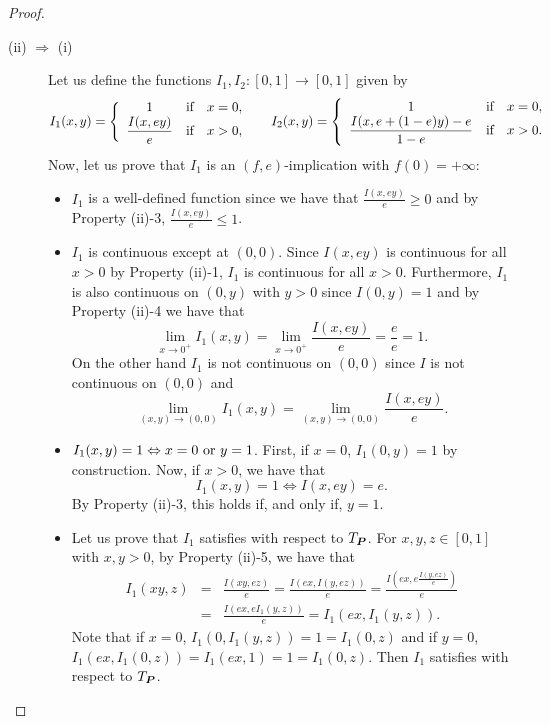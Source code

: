 \begin{proof}
	\begin{description}
	\item[(ii) $\Rightarrow$ (i)] Let us define the functions $I_1,I_2:[0,1] \to [0,1]$ given by
	$$I_1(x,y)=\left\{ \begin{array}{ccl}
		1 &   \hbox{if}  & x=0, \\
		\displaystyle \frac{I(x,ey)}{e} &  \hbox{if} & x>0, \\
	\end{array}
	\right.
	\hspace{0.5cm}
	I_2(x,y)=\left\{ \begin{array}{ccl}
		1 &   \hbox{if}  & x=0, \\
		\displaystyle \frac{I(x,e+(1-e)y)-e}{1-e} &  \hbox{if} & x>0. \\
	\end{array}
	\right.
	$$
	Now, let us prove that $I_1$ is an $(f,e)$-implication with $f(0) = +\infty$:
	\begin{itemize}
		\item $I_1$ is a well-defined function since we have that $\frac{I(x,ey)}{e}\geq 0$ and by Property (ii)-3, $\frac{I(x,ey)}{e} \leq 1$.
		\item $I_1$ is continuous except at $(0,0)$. Since $I(x,ey)$ is continuous for all $x>0$ by Property (ii)-1, $I_1$ is continuous for all $x>0$. Furthermore, $I_1$ is also continuous on $(0,y)$ with $y>0$ since $I(0,y)=1$ and by Property (ii)-4 we have that 
		$$\lim_{x \to 0^+} I_1(x,y)= \lim_{x \to 0^+} \frac{I(x,ey)}{e} = \frac{e}{e}=1.$$
		On the other hand $I_1$ is not continuous on $(0,0)$ since $I$ is not continuous on $(0,0)$ and
		$$ \lim_{(x,y) \to (0,0)} I_1(x,y) = \lim_{(x,y) \to (0,0)} \frac{I(x,ey)}{e}.$$
		\item  $I_1(x,y)=1 \Leftrightarrow x=0 \hbox{ or } y=1$. First, if $x=0$, $I_1(0,y)=1$ by construction. Now, if $x>0$, we have that
		$$I_1(x,y)=1 \Leftrightarrow I(x,ey)=e.$$
		By Property (ii)-3, this holds if, and only if, $y=1$.
		\item  Let us prove that $I_1$ satisfies \LIex with respect to $T_{\bm{P}}$.  For $x,y,z \in[0,1]$ with $x,y>0$, by Property (ii)-5, we have that
		\begin{eqnarray*}
		I_1(xy,z) &=& \frac{I(xy,ez)}{e} = \frac{I\left(ex,I(y,ez)\right)}{e} = \frac{I\left(ex,e\frac{I(y,ez)}{e}\right)}{e}\\
		&=&\frac{I(ex,eI_1(y,z))}{e} = I_1(ex,I_1(y,z)).
		\end{eqnarray*}
		Note that if $x=0$, $I_1(0,I_1(y,z))=1=I_1(0,z)$ and if $y=0$, $I_1(ex,I_1(0,z))=I_1(ex,1)=1=I_1(0,z)$. Then $I_1$ satisfies  \LIex with respect to $T_{\bm{P}}$.

\end{itemize}
\end{description}
\end{proof}
